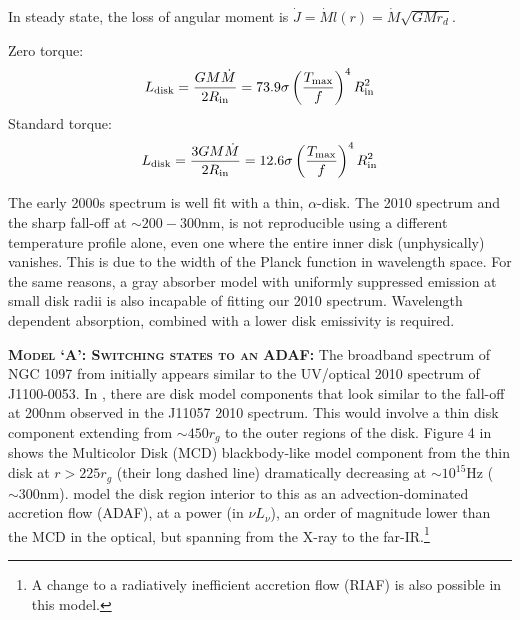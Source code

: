 \documentclass[11pt,a4paper]{article}
\begin{document}
In steady state, the loss of angular moment is $\dot{J} = \dot{M} l(r)
= \dot{M} \sqrt{GMr_{d}}$.

Zero torque: 
\begin{equation}
L_{\rm disk}   =  \frac{G M \dot{M}}  {2 R_{\rm in}}    = 73.9 \sigma\left ( \frac{T_{\rm max}}{f}  \right )^{4}  R^{2}_{\rm in} 
\end{equation}
Standard torque: 
\begin{equation}
L_{\rm disk} = \frac{3 G M \dot{M}}  {2 R_{\rm in}}    = 12.6 \sigma\left ( \frac{T_{\rm max}}{f}  \right )^{4}  R^{2}_{\rm in} 
\end{equation} 

The early 2000s spectrum is well fit with a thin, \citet{SS73} $\alpha$-disk. The 2010 spectrum and the sharp fall-off at $\sim 200-300$nm, is not reproducible using a different temperature profile alone, even one where the entire inner disk (unphysically) vanishes. This is due to the width of the Planck function in wavelength space. For the same reasons, a gray absorber model with uniformly suppressed emission at small disk radii is also incapable of fitting our 2010 \citep[or ][]{Guo2016} spectrum. Wavelength dependent absorption, combined with a lower disk emissivity is required. 

\smallskip \smallskip
\noindent
\textbf{\textsc{Model `A': Switching states to an ADAF: }}
The broadband spectrum of NGC 1097 from \citet{Nemmen2006} initially appears similar to the UV/optical 2010 spectrum of J1100-0053.  In \citet[][e.g., their Figure 4]{Nemmen2006}, there are disk model components that look similar to the fall-off at 200nm observed in the J11057 2010 spectrum. This would involve a thin disk component extending from $\sim 450r_{g}$ to the outer regions of the disk. Figure 4 in \citet{Nemmen2006} shows the Multicolor Disk (MCD) blackbody-like model component from the thin disk at $r>225r_{g}$ (their long dashed line) dramatically decreasing at $\sim 10^{15}$Hz ($\sim 300$nm). \citet{Nemmen2006} model the disk region interior to this as an advection-dominated accretion flow (ADAF), at a power (in $\nu L_{\nu}$), an order of magnitude lower than the MCD in the optical, but spanning from the X-ray to the far-IR.\footnote{A change to  a radiatively inefficient accretion flow (RIAF) is also possible in this model.}
\end{document}
